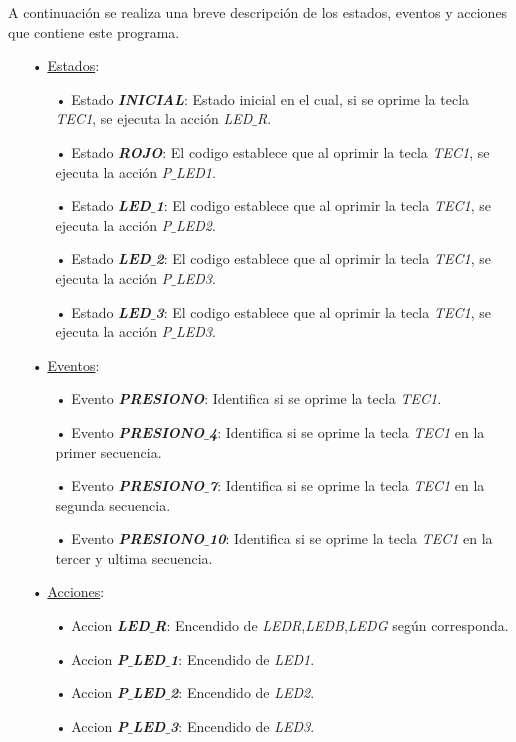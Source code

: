 \documentclass[12pt,letterpaper]{article}
\begin{document}
A continuación se realiza una breve descripción de los estados, eventos y acciones que contiene este programa.
\begin{enumerate}
\item[•]\underline{Estados}:
\begin{enumerate}
\item[•]Estado \textit{\textbf{INICIAL}}: Estado inicial en el cual, si se oprime la tecla \textit{TEC1}, se ejecuta la acción \textit{LED$\_$R}.
\item[•]Estado \textit{\textbf{ROJO}}: El codigo establece que al oprimir la tecla \textit{TEC1}, se ejecuta la acción \textit{P$\_$LED1}. 
\item[•]Estado \textit{\textbf{LED$\_$1}}: El codigo establece que al oprimir la tecla \textit{TEC1}, se ejecuta la acción \textit{P$\_$LED2}.
\item[•]Estado \textit{\textbf{LED$\_$2}}: El codigo establece que al oprimir la tecla \textit{TEC1}, se ejecuta la acción \textit{P$\_$LED3}.
\item[•]Estado \textit{\textbf{LED$\_$3}}: El codigo establece que al oprimir la tecla \textit{TEC1}, se ejecuta la acción \textit{P$\_$LED3}.  
\end{enumerate}
\item[•]\underline{Eventos}:
\begin{enumerate}
\item[•]Evento \textit{\textbf{PRESIONO}}: Identifica si se oprime la tecla \textit{TEC1}.
\item[•]Evento \textit{\textbf{PRESIONO$\_$4}}: Identifica si se oprime la tecla \textit{TEC1} en la primer secuencia.
\item[•]Evento \textit{\textbf{PRESIONO$\_$7}}: Identifica si se oprime la tecla \textit{TEC1} en la segunda secuencia.
\item[•]Evento \textit{\textbf{PRESIONO$\_$10}}: Identifica si se oprime la tecla \textit{TEC1} en la tercer y ultima secuencia.
\end{enumerate}
\item[•]\underline{Acciones}:
\begin{enumerate}
\item[•]Accion \textit{\textbf{LED$\_$R}}: Encendido de \textit{LEDR},\textit{LEDB},\textit{LEDG} según corresponda.
\item[•]Accion \textit{\textbf{P$\_$LED$\_$1}}: Encendido de \textit{LED1}.
\item[•]Accion \textit{\textbf{P$\_$LED$\_$2}}: Encendido de \textit{LED2}.
\item[•]Accion \textit{\textbf{P$\_$LED$\_$3}}: Encendido de \textit{LED3}.
\end{enumerate}
\end{enumerate}
\end{document}
